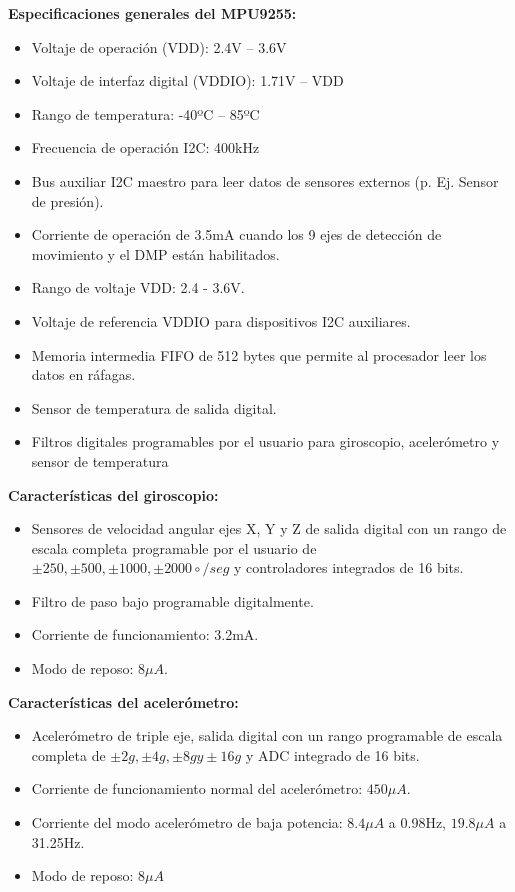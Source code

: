 \textbf{Especificaciones generales del MPU9255:}
\begin{itemize}
\item Voltaje de operación (VDD): 2.4V – 3.6V
\item Voltaje de interfaz digital (VDDIO): 1.71V – VDD
\item Rango de temperatura: -40ºC – 85ºC
\item Frecuencia de operación I2C: 400kHz
\item Bus auxiliar I2C maestro para leer datos de sensores externos (p. Ej. Sensor de presión).
\item Corriente de operación de 3.5mA cuando los 9 ejes de detección de movimiento y el DMP están habilitados.
\item Rango de voltaje VDD: 2.4 - 3.6V.
\item Voltaje de referencia VDDIO para dispositivos I2C auxiliares.
\item Memoria intermedia FIFO de 512 bytes que permite al procesador leer los datos en ráfagas.
\item Sensor de temperatura de salida digital.
\item Filtros digitales programables por el usuario para giroscopio, acelerómetro y sensor de temperatura
\end{itemize}


\textbf{Características del giroscopio:}
\begin{itemize}
\item Sensores de velocidad angular ejes X, Y y Z de salida digital con un rango de escala completa programable por el usuario de \emph{$\pm 250, \pm 500, \pm 1000, \pm 2000  {\circ}/seg$} y controladores integrados de 16 bits.
\item Filtro de paso bajo programable digitalmente.
\item Corriente de funcionamiento: 3.2mA.
\item Modo de reposo: $8\mu A$.
\end{itemize}


\textbf{Características del acelerómetro:}
\begin{itemize}
\item Acelerómetro de triple eje, salida digital con un rango programable de escala completa de \emph{$\pm 2 g , \pm 4 g , \pm 8 gy \pm 16 g$} y ADC integrado de 16 bits.
\item Corriente de funcionamiento normal del acelerómetro: $450 \mu A$.
\item Corriente del modo acelerómetro de baja potencia: $8.4\mu A$ a 0.98Hz, $19.8\mu A$ a 31.25Hz.
\item Modo de reposo: $8\mu A$
\end{itemize}

